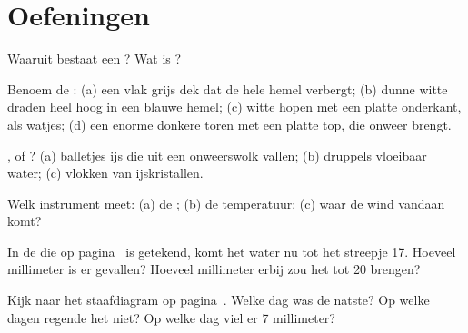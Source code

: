 \section{Oefeningen}

\begin{exercise}[$\star$]\label{exo:g4:clouds-rain-snow:1}
Waaruit bestaat een ? Wat is ?
\end{exercise}

\begin{exercise}[$\star$]\label{exo:g4:clouds-rain-snow:2}
Benoem de : (a) een vlak grijs dek dat de hele hemel verbergt; (b) dunne
witte draden heel hoog in een blauwe hemel; (c) witte hopen met een platte
onderkant, als watjes; (d) een enorme donkere toren met een platte top, die
onweer brengt.
\end{exercise}

\begin{exercise}[$\star$]\label{exo:g4:clouds-rain-snow:3}
,  of ? (a) balletjes ijs die uit een onweerswolk vallen;
(b) druppels vloeibaar water; (c) vlokken van ijskristallen.
\end{exercise}

\begin{exercise}[$\star$]\label{exo:g4:clouds-rain-snow:4}
Welk instrument meet: (a) de ; (b) de temperatuur; (c) waar de wind
vandaan komt?
\end{exercise}

\begin{exercise}[$\star$]\label{exo:g4:clouds-rain-snow:5}
In de  die op pagina~\pageref{fig:g4:clouds-rain-snow:gauge} is
getekend, komt het water nu tot het streepje 17. Hoeveel millimeter 
is er gevallen? Hoeveel millimeter erbij zou het tot 20 brengen?
\end{exercise}

\begin{exercise}[$\star$]\label{exo:g4:clouds-rain-snow:6}
Kijk naar het staafdiagram op pagina~\pageref{fig:g4:clouds-rain-snow:bars}.
Welke dag was de natste? Op welke dagen regende het niet? Op welke dag viel
er 7 millimeter?
\end{exercise}

